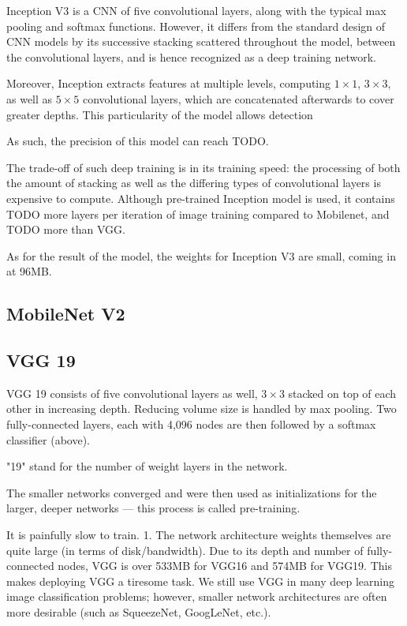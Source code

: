 \documentclass[se,blockletter]{uw-wkrpt}
\begin{document}
Inception V3 is a CNN of five convolutional layers, along with the typical max pooling and softmax functions. However, it differs from the standard design of CNN models by its successive stacking scattered throughout the model, between the convolutional layers, and is hence recognized as a deep training network.

Moreover, Inception extracts features at multiple levels, computing $1\times 1$, $3\times 3$, as well as $5 \times 5$ convolutional layers, which are concatenated afterwards to cover greater depths. This particularity of the model allows detection 

As such, the precision of this model can reach TODO.

The trade-off of such deep training is in its training speed: the processing of both the amount of stacking as well as the differing types of convolutional layers is expensive to compute. Although pre-trained Inception model is used, it contains TODO more layers per iteration of image training compared to Mobilenet, and TODO more than VGG.


As for the result of the model, the weights for Inception V3 are small, coming in at 96MB.



\subsection{MobileNet V2}


\subsection{VGG 19}
VGG 19 consists of five convolutional layers as well, $3 \times 3$ stacked on top of each other in increasing depth. Reducing volume size is handled by max pooling. Two fully-connected layers, each with 4,096 nodes are then followed by a softmax classifier (above).

"19" stand for the number of weight layers in the network.

The smaller networks converged and were then used as initializations for the larger, deeper networks — this process is called pre-training.


It is painfully slow to train.
    1. The network architecture weights themselves are quite large (in terms of disk/bandwidth).
Due to its depth and number of fully-connected nodes, VGG is over 533MB for VGG16 and 574MB for VGG19. This makes deploying VGG a tiresome task.
We still use VGG in many deep learning image classification problems; however, smaller network architectures are often more desirable (such as SqueezeNet, GoogLeNet, etc.).
\end{document}
